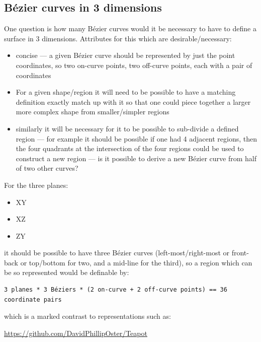 \documentclass{ltxdoc}
\begin{document}
\subsection{Bézier curves in 3 dimensions}
 
One question is how many Bézier curves would it be necessary to have to define a surface
in 3 dimensions. Attributes for this which are desirable/necessary:

\begin{itemize}
\item concise --- a given Bézier curve should be represented by just the point coordinates, 
      so two on-curve points, two off-curve points, each with a pair of coordinates
\item For a given shape/region it will need to be possible to have a matching definition 
      exactly match up with it so that one could piece together a larger more complex shape 
      from smaller/simpler regions
\item similarly it will be necessary for it to be possible to sub-divide a defined region --- 
      for example it should be possible if one had 4 adjacent regions, then the four quadrants 
      at the intersection of the four regions could be used to construct a new region --- is it
      possible to derive a new Bézier curve from half of two other curves?
\end{itemize}

\begin{samepage}
For the three planes:

\begin{itemize}
 \item XY
 \item XZ
 \item ZY
\end{itemize}
 
\noindent it should be possible to have three Bézier curves (left-most/right-most or front-back or 
top/bottom for two, and a mid-line for the third), so a region which can be so represented would 
be definable by:
 
\begin{verbatim}
3 planes * 3 Béziers * (2 on-curve + 2 off-curve points) == 36 coordinate pairs
\end{verbatim}
\end{samepage}
 
\noindent which is a marked contrast to representations such as:
 
\url{https://github.com/DavidPhillipOster/Teapot}
\end{document}
